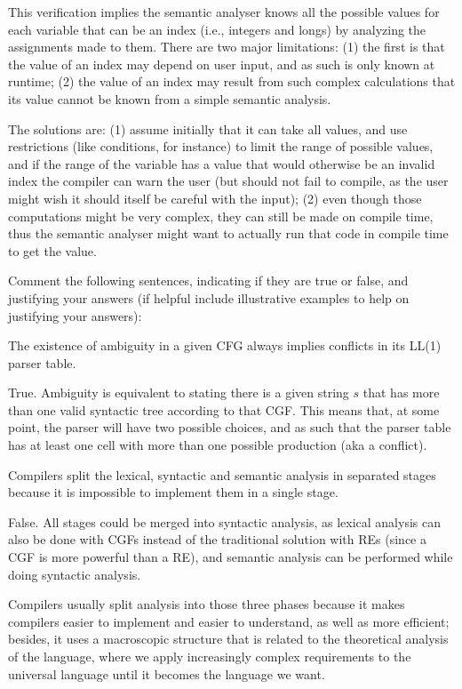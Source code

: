 \documentclass[docid=2017]{comp_test1}
\begin{document}
\ansseparator

\noindent
This verification implies the semantic analyser knows all the possible values for each variable that can be an index (i.e., integers and longs) by analyzing the assignments made to them. There are two major limitations: (1) the first is that the value of an index may depend on user input, and as such is only known at runtime; (2) the value of an index may result from such complex calculations that its value cannot be known from a simple semantic analysis.

The solutions are: (1) assume initially that it can take all values, and use restrictions (like conditions, for instance) to limit the range of possible values, and if the range of the variable has a value that would otherwise be an invalid index the compiler can warn the user (but should not fail to compile, as the user might wish it should itself be careful with the input); (2) even though those computations might be very complex, they can still be made on compile time, thus the semantic analyser might want to actually run that code in compile time to get the value.


Comment the following sentences, indicating if they are true or false, and justifying your answers (if helpful include illustrative examples to help on justifying your answers):

\question
The existence of ambiguity in a given CFG always implies conflicts in its LL(1) parser table.

\ansseparator

\noindent
True. Ambiguity is equivalent to stating there is a given string $s$ that has more than one valid syntactic tree according to that CGF. This means that, at some point, the parser will have two possible choices, and as such that the parser table has at least one cell with more than one possible production (aka a conflict).

\question
Compilers split the lexical, syntactic and semantic analysis in separated stages because it is impossible to implement them in a single stage.

\ansseparator

False. All stages could be merged into syntactic analysis, as lexical analysis can also be done with CGFs instead of the traditional solution with REs (since a CGF is more powerful than a RE), and semantic analysis can be performed while doing syntactic analysis.

Compilers usually split analysis into those three phases because it makes compilers easier to implement and easier to understand, as well as more efficient; besides, it uses a macroscopic structure that is related to the theoretical analysis of the language, where we apply increasingly complex requirements to the universal language until it becomes the language we want.
\end{document}
